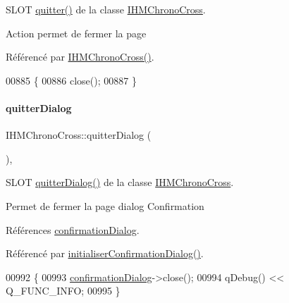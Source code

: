 S\+L\+OT \hyperlink{class_i_h_m_chrono_cross_a283c721d31f90031d9a189eafb303b84}{quitter()} de la classe \hyperlink{class_i_h_m_chrono_cross}{I\+H\+M\+Chrono\+Cross}. 

Action permet de fermer la page 

Référencé par \hyperlink{class_i_h_m_chrono_cross_a479fc90733fba3e65fb06aa4a3adc02e}{I\+H\+M\+Chrono\+Cross()}.


\begin{DoxyCode}
00885 \{
00886     close();
00887 \}
\end{DoxyCode}
\mbox{\label{class_i_h_m_chrono_cross_a1e8e6d42ec7397a619940bc7bec4a6ca}} 
\paragraph{\texorpdfstring{quitter\+Dialog}{quitterDialog}}
{\footnotesize\ttfamily I\+H\+M\+Chrono\+Cross\+::quitter\+Dialog (\begin{DoxyParamCaption}{ }\end{DoxyParamCaption})\hspace{0.3cm}{\ttfamily [private]}, {\ttfamily [slot]}}



S\+L\+OT \hyperlink{class_i_h_m_chrono_cross_a1e8e6d42ec7397a619940bc7bec4a6ca}{quitter\+Dialog()} de la classe \hyperlink{class_i_h_m_chrono_cross}{I\+H\+M\+Chrono\+Cross}. 

Permet de fermer la page dialog Confirmation 

Références \hyperlink{class_i_h_m_chrono_cross_ad7fc4afa5689501063cc207a8daf5752}{confirmation\+Dialog}.



Référencé par \hyperlink{class_i_h_m_chrono_cross_a866a247fad23eca2af31ed985afe7cd3}{initialiser\+Confirmation\+Dialog()}.


\begin{DoxyCode}
00992 \{
00993     \hyperlink{class_i_h_m_chrono_cross_ad7fc4afa5689501063cc207a8daf5752}{confirmationDialog}->close();
00994     qDebug() << Q\_FUNC\_INFO;
00995 \}
\end{DoxyCode}
\mbox{\label{class_i_h_m_chrono_cross_aaf8fa3bf16956fd0e0ceeab6e65f6741}} 
